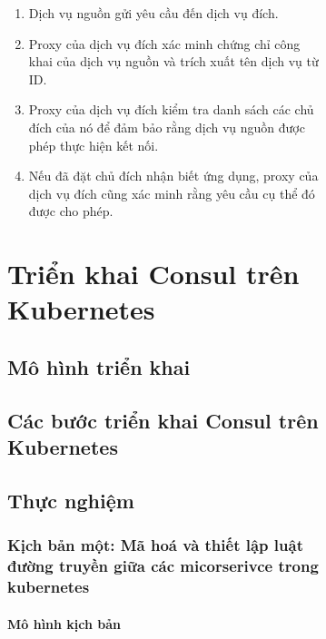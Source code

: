 \documentclass[12pt,a4paper]{report}
\begin{document}
\begin{figure}[h]
\begin{figure}[h]
	\hspace{0.3cm}{Ngoài việc chỉ định các quy tắc dựa trên dịch vụ nguồn và đích, bạn có thể sử dụng các chủ đích để kiểm soát các phương thức, đường dẫn và tiêu đề HTTP hoặc gRPC nào được ủy quyền. Consul gọi những chủ đích này là nhận biết ứng dụng vì chúng liên quan đến cách ứng dụng thực sự hoạt động. Ví dụ: bạn có thể tạo một chủ đích cho phép cổng vào truy cập vào bất kỳ đường dẫn nào trên dịch vụ giao diện người dùng ngoại trừ /admin.\\}
	
	\hspace{0.3cm}{Cơ chế thực thi chủ đích như sau:}
	
	\begin{enumerate}
	\item Dịch vụ nguồn gửi yêu cầu đến dịch vụ đích.
	\item Proxy của dịch vụ đích xác minh chứng chỉ công khai của dịch vụ nguồn và trích xuất tên dịch vụ từ ID.
	\item Proxy của dịch vụ đích kiểm tra danh sách các chủ đích của nó để đảm bảo rằng dịch vụ nguồn được phép thực hiện kết nối.
	\item Nếu đã đặt chủ đích nhận biết ứng dụng, proxy của dịch vụ đích cũng xác minh rằng yêu cầu cụ thể đó được cho phép.
	\end{enumerate}

	\chapter{Triển khai Consul trên Kubernetes}
	\section{Mô hình triển khai}
	\section{Các bước triển khai Consul trên Kubernetes}
	\section{Thực nghiệm}
	\subsection{Kịch bản một: Mã hoá và thiết lập luật đường truyền giữa các micorserivce trong kubernetes}
	\subsubsection{Mô hình kịch bản}
	 \begin{figure}[h]


\end{figure}
\end{figure}
\end{figure}
\end{document}
